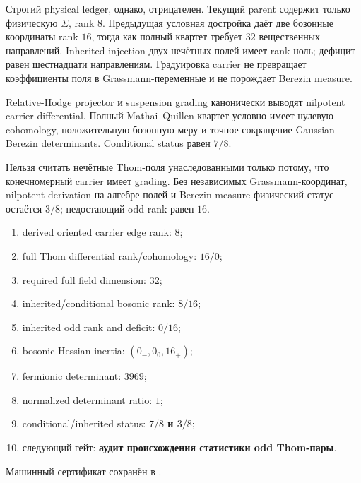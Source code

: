 Строгий physical ledger, однако, отрицателен. Текущий parent содержит
только физическую $\Sigma$, rank $8$. Предыдущая условная достройка даёт
две бозонные координаты rank $16$, тогда как полный квартет требует
$32$ вещественных направлений. Inherited injection двух нечётных полей
имеет rank ноль; дефицит равен шестнадцати направлениям. Градуировка
carrier не превращает коэффициенты поля в Grassmann-переменные и не
порождает Berezin measure.

\begin{theorem}
Relative-Hodge projector и suspension grading канонически выводят
nilpotent carrier differential. Полный Mathai--Quillen-квартет условно
имеет нулевую cohomology, положительную бозонную меру и точное сокращение
Gaussian--Berezin determinants. Conditional status равен $7/8$.
\end{theorem}

\begin{nogocriterion}
Нельзя считать нечётные Thom-поля унаследованными только потому, что
конечномерный carrier имеет grading. Без независимых Grassmann-координат,
nilpotent derivation на алгебре полей и Berezin measure физический статус
остаётся $3/8$; недостающий odd rank равен $16$.
\end{nogocriterion}

\begin{protocol}\begin{enumerate}
\item derived oriented carrier edge rank: \textbf{$8$};
\item full Thom differential rank/cohomology: \textbf{$16/0$};
\item required full field dimension: \textbf{$32$};
\item inherited/conditional bosonic rank: \textbf{$8/16$};
\item inherited odd rank and deficit: \textbf{$0/16$};
\item bosonic Hessian inertia: \textbf{$(0_-,0_0,16_+)$};
\item fermionic determinant: \textbf{$3969$};
\item normalized determinant ratio: \textbf{$1$};
\item conditional/inherited status: \textbf{$7/8$ и $3/8$};
\item следующий гейт: \textbf{аудит происхождения статистики odd Thom-пары}.
\end{enumerate}\end{protocol}

Машинный сертификат сохранён в
.